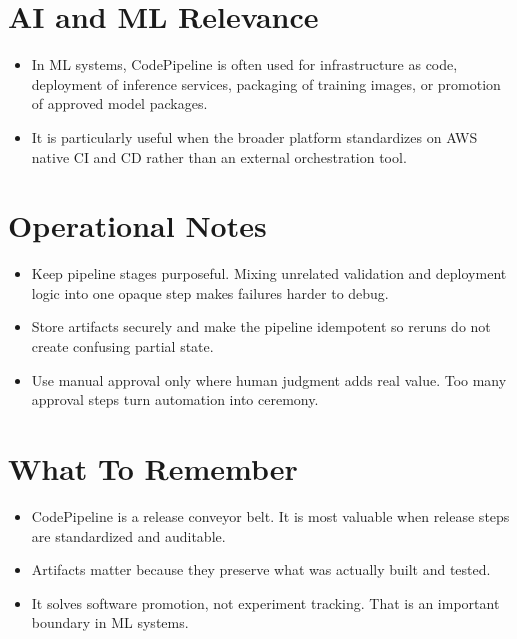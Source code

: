 \documentclass[10pt,twocolumn]{article}
\begin{document}
\section*{AI and ML Relevance}
\begin{itemize}
\item In ML systems, CodePipeline is often used for infrastructure as code, deployment of inference services, packaging of training images, or promotion of approved model packages.
\item It is particularly useful when the broader platform standardizes on AWS native CI and CD rather than an external orchestration tool.
\end{itemize}

\section*{Operational Notes}
\begin{itemize}
\item Keep pipeline stages purposeful. Mixing unrelated validation and deployment logic into one opaque step makes failures harder to debug.
\item Store artifacts securely and make the pipeline idempotent so reruns do not create confusing partial state.
\item Use manual approval only where human judgment adds real value. Too many approval steps turn automation into ceremony.
\end{itemize}

\section*{What To Remember}
\begin{itemize}
\item CodePipeline is a release conveyor belt. It is most valuable when release steps are standardized and auditable.
\item Artifacts matter because they preserve what was actually built and tested.
\item It solves software promotion, not experiment tracking. That is an important boundary in ML systems.
\end{itemize}
\end{document}
